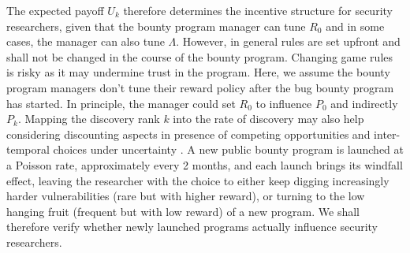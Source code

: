  The expected payoff $U_k$ therefore determines the incentive structure for security researchers, given that the bounty program manager can tune $R_0$ and in some cases, the manager can also tune $\Lambda$. However, in general rules are set upfront and shall not be changed in the course of the bounty program. Changing game rules is risky as it may undermine trust in the program. Here, we assume the bounty program managers don't tune their reward policy after the bug bounty program has started. In principle, the manager could set $R_0$ to influence $P_0$ and indirectly $P_{k}$. Mapping the discovery rank $k$ into the rate of discovery may also help considering discounting aspects in presence of competing opportunities and inter-temporal choices under uncertainty \cite{loewenstein1992anomalies}. A new public bounty program is launched at a Poisson rate, approximately every 2 months, and each launch brings its windfall effect, leaving the researcher with the choice to either keep digging increasingly harder vulnerabilities (rare but with higher reward), or turning to the low hanging fruit (frequent but with low reward) of a new program. We shall therefore verify whether newly launched programs actually influence security researchers.








